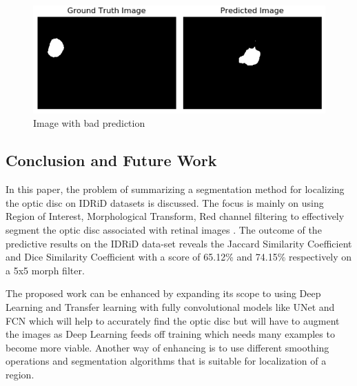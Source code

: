 \documentclass[conference]{IEEEtran}
\begin{document}
\begin{figure}[H]
	\centering
	\includegraphics[width=\linewidth]{images/bad.PNG}
	\caption{Image with bad prediction}
	\label{fig:bad}
\end{figure}


\subsection{Conclusion and Future Work}

In this paper, the problem of summarizing a segmentation method for localizing the optic disc on IDRiD datasets is discussed. The focus is mainly on using Region of Interest, Morphological Transform, Red channel filtering to effectively segment the optic disc associated with retinal images \cite{idrid}. The outcome of the predictive results on the IDRiD data-set reveals the Jaccard Similarity Coefficient and Dice Similarity Coefficient with a score of 65.12\% and 74.15\% respectively on a 5x5 morph filter.
\par 
The proposed work can be enhanced by expanding its scope to using Deep Learning and Transfer learning with fully convolutional models like UNet and FCN which will help to accurately find the optic disc but will have to augment the images as Deep Learning feeds off training which needs many examples to become more viable. Another way of enhancing is to use different smoothing operations and segmentation algorithms that is suitable for localization of a region.







\end{document}
